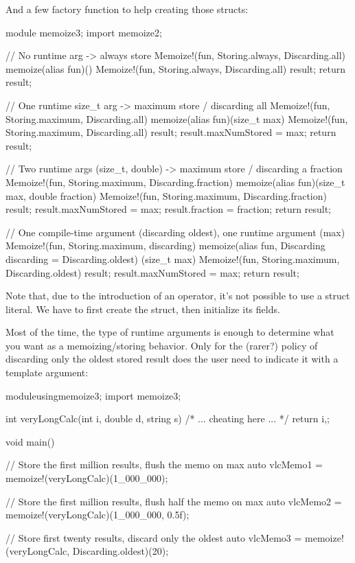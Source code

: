 And a few factory function to help creating those  structs:

\begin{dcode}
module memoize3;
import memoize2;

// No runtime arg -> always store
Memoize!(fun, Storing.always, Discarding.all)
memoize(alias fun)()
{
    Memoize!(fun, 
             Storing.always, 
             Discarding.all) result;
    return result;
}

// One runtime size_t arg -> maximum store / discarding all
Memoize!(fun, Storing.maximum, Discarding.all)
memoize(alias fun)(size_t max)
{
    Memoize!(fun, 
             Storing.maximum, 
             Discarding.all) result;
    result.maxNumStored = max;
    return result;
}

// Two runtime args (size_t, double) -> maximum store / discarding a fraction
Memoize!(fun, Storing.maximum, Discarding.fraction)
memoize(alias fun)(size_t max, double fraction)
{
    Memoize!(fun, 
             Storing.maximum, 
             Discarding.fraction) result;
    result.maxNumStored = max;
    result.fraction = fraction;
    return result;
}

// One compile-time argument (discarding oldest), one runtime argument (max)
Memoize!(fun, Storing.maximum, discarding)
memoize(alias fun, Discarding discarding = Discarding.oldest)
(size_t max)
{
    Memoize!(fun, 
             Storing.maximum, 
             Discarding.oldest) result;
    result.maxNumStored = max;
    return result;
}
\end{dcode}

Note that, due to the introduction of an  operator, it's not possible to use a struct literal. We have to first create the struct, then initialize its fields.

Most of the time, the type of runtime arguments is enough to determine what you want as a memoizing/storing behavior. Only for the (rarer?) policy of discarding only the oldest stored result does the user need to indicate it with a template argument:

\begin{dcode}
moduleusingmemoize3;
import memoize3;

int veryLongCalc(int i, double d, string s)
{
   /* ... cheating here ... */
   return i,;
}

void main()
{
    // Store the first million results, flush the memo on max
    auto vlcMemo1 = memoize!(veryLongCalc)(1_000_000);

    // Store the first million results, flush half the memo on max
    auto vlcMemo2 = memoize!(veryLongCalc)(1_000_000, 0.5f);

    // Store first twenty results, discard only the oldest  
    auto vlcMemo3 = memoize!(veryLongCalc, Discarding.oldest)(20);
}
\end{dcode}

